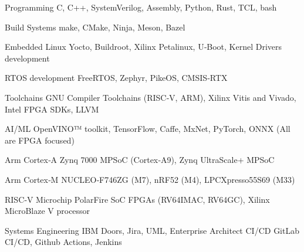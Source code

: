 

\begin{cvskills}

  \cvskill
    {Programming} %
    {C, C++, SystemVerilog, Assembly, Python, Rust, TCL, bash} %

  \cvskill
    {Build Systems} %
    {make, CMake, Ninja, Meson, Bazel} %

  \cvskill
    {Embedded Linux} %
    {Yocto, Buildroot, Xilinx Petalinux, U‑Boot, Kernel Drivers development} %

  \cvskill
    {RTOS development} %
    {FreeRTOS, Zephyr, PikeOS, CMSIS‑RTX} %

  \cvskill
    {Toolchains} %
    {GNU Compiler Toolchains (RISC‑V, ARM), Xilinx Vitis and Vivado, Intel FPGA SDKs, LLVM} %

  \cvskill
  {AI/ML} %
  {OpenVINO™ toolkit, TensorFlow, Caffe, MxNet, PyTorch, ONNX (All are FPGA focused)} %

  \cvskill
  {Arm Cortex‑A} %
  {Zynq 7000 MPSoC (Cortex‑A9), Zynq UltraScale+ MPSoC} %

  \cvskill
  {Arm Cortex‑M} %
  {NUCLEO‑F746ZG (M7), nRF52 (M4), LPCXpresso55S69 (M33)} %

  \cvskill
  {RISC‑V} %
  {Microchip PolarFire SoC FPGAs (RV64IMAC, RV64GC), Xilinx MicroBlaze V processor} %

  \cvskill
  {Systems Engineering} %
  {IBM Doors, Jira, UML, Enterprise Architect} %
  \cvskill
  {CI/CD} %
  {GitLab CI/CD, Github Actions, Jenkins} %


\end{cvskills}
